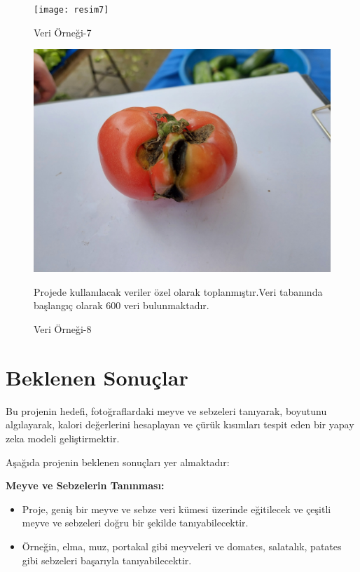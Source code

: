 \documentclass[11pt,a4paper]{report}
\begin{document}
	\begin{figure}[!h]
		
		\centering
		\texttt{[image: resim7]}
		\caption{Veri Örneği-7}
		
	\end{figure}
	\begin{figure}[!h]
		
		\centering
		\includegraphics[width=\textwidth]{resim8}
		\caption{Veri Örneği-8}
		
		Projede kullanılacak veriler özel olarak toplanmıştır.Veri tabanında başlangıç olarak 600 veri bulunmaktadır. 
	\end{figure}
	
    \clearpage
    
    \section{Beklenen Sonuçlar}
     Bu projenin hedefi, fotoğraflardaki meyve ve sebzeleri tanıyarak, boyutunu algılayarak, kalori değerlerini hesaplayan ve çürük kısımları tespit eden bir yapay zeka modeli geliştirmektir. 
    \newline
    
    Aşağıda projenin beklenen sonuçları yer almaktadır:
    \newline
    
    \textbf{Meyve ve Sebzelerin Tanınması:} 
    \begin{itemize}
      \item Proje, geniş bir meyve ve sebze veri kümesi üzerinde eğitilecek ve çeşitli meyve ve sebzeleri doğru bir şekilde tanıyabilecektir.
      \item Örneğin, elma, muz, portakal gibi meyveleri ve domates, salatalık, patates gibi sebzeleri başarıyla tanıyabilecektir.
    \end{itemize}
  
\end{document}
